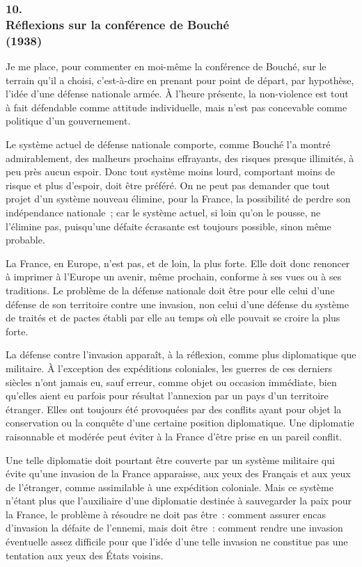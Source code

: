 \documentclass[french,twoside]{book} %
\begin{document}
\subsubsection[10. Réflexions sur la conférence de Bouché, (1938)]{10. \\
Réflexions sur la conférence de Bouché \\
(1938)}
\noindent \par
Je me place, pour commenter en moi-même la conférence de Bouché, sur le terrain qu'il a choisi, c'est-à-dire en prenant pour point de départ, par hypothèse, l'idée d'une défense nationale armée. À l'heure présente, la non-violence est tout à fait défendable comme attitude individuelle, mais n'est pas concevable comme politique d'un gouvernement.\par
Le système actuel de défense nationale comporte, comme Bouché l'a montré admirablement, des malheurs prochains effrayants, des risques presque illimités, à peu près aucun espoir. Donc tout système moins lourd, comportant moins de risque et plus d'espoir, doit être préféré. On ne peut pas demander que tout projet d'un système nouveau élimine, pour la France, la possibilité de perdre son indépendance nationale ; car le système actuel, si loin qu'on le pousse, ne l'élimine pas, puisqu'une défaite écrasante est toujours possible, sinon même probable.\par
La France, en Europe, n'est pas, et de loin, la plus forte. Elle doit donc renoncer à imprimer à l'Europe un avenir, même prochain, conforme à ses vues ou à ses traditions. Le problème de la défense nationale doit être pour elle celui d'une défense de son territoire contre une invasion, non celui d'une défense du système de traités et de pactes établi par elle au temps où elle pouvait se croire la plus forte.\par
La défense contre l'invasion apparaît, à la réflexion, comme plus diploma­tique que militaire. À l'exception des expéditions coloniales, les guerres de ces derniers siècles n'ont jamais eu, sauf erreur, comme objet ou occasion immédiate, bien qu'elles aient eu parfois pour résultat l'annexion par un pays d'un territoire étranger. Elles ont toujours été provoquées par des conflits ayant pour objet la conservation ou la conquête d'une certaine position diplo­matique. Une diplomatie raisonnable et modérée peut éviter à la France d'être prise en un pareil conflit.\par
Une telle diplomatie doit pourtant être couverte par un système militaire qui évite qu'une invasion de la France apparaisse, aux yeux des Français et aux yeux de l'étranger, comme assimilable à une expédition coloniale. Mais ce système n'étant plus que l'auxiliaire d'une diplomatie destinée à sauvegarder la paix pour la France, le problème à résoudre ne doit pas être : comment assurer encas d'invasion la défaite de l'ennemi, mais doit être : comment rendre une invasion éventuelle assez difficile pour que l'idée d'une telle invasion ne constitue pas une tentation aux yeux des États voisins.\par
\end{document}
